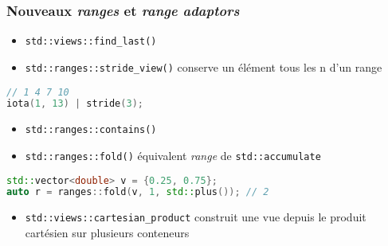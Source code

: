 \documentclass[C++.tex]{subfiles}
\begin{document}
\begin{frame}[fragile]
	\frametitle{Nouveaux \textit{ranges} et \textit{range adaptors}}
	\begin{itemize}
		\item \lstinline|std::views::find_last()|
		\item \lstinline|std::ranges::stride_view()| conserve un élément tous les n d'un range
	\end{itemize}

	\begin{lstlisting}[language=C++]
// 1 4 7 10
iota(1, 13) | stride(3);\end{lstlisting}

	\begin{itemize}
		\item \lstinline|std::ranges::contains()|
		\item \lstinline|std::ranges::fold()| équivalent \textit{range} de \lstinline|std::accumulate|
	\end{itemize}

	\begin{lstlisting}[language=C++]
std::vector<double> v = {0.25, 0.75};
auto r = ranges::fold(v, 1, std::plus()); // 2\end{lstlisting}

	\begin{itemize}
		\item \lstinline|std::views::cartesian_product| construit une vue depuis le produit cartésien sur plusieurs conteneurs
	\end{itemize}
\end{frame}
\end{document}
